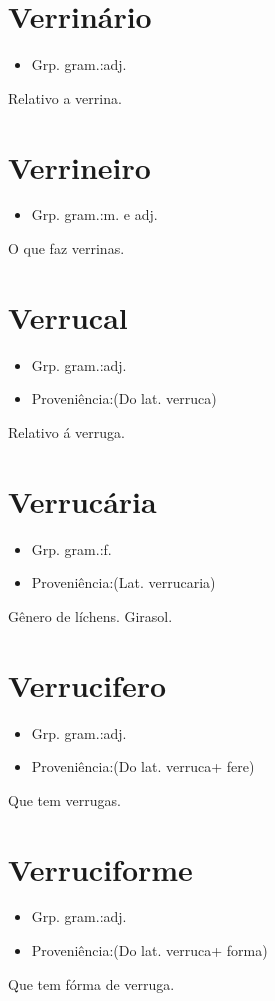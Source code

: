 \documentclass{article}
\begin{document}
\section{Verrinário}
\begin{itemize}
\item {Grp. gram.:adj.}
\end{itemize}
Relativo a verrina.
\section{Verrineiro}
\begin{itemize}
\item {Grp. gram.:m.  e  adj.}
\end{itemize}
O que faz verrinas.
\section{Verrucal}
\begin{itemize}
\item {Grp. gram.:adj.}
\end{itemize}
\begin{itemize}
\item {Proveniência:(Do lat. \textunderscore verruca\textunderscore )}
\end{itemize}
Relativo á verruga.
\section{Verrucária}
\begin{itemize}
\item {Grp. gram.:f.}
\end{itemize}
\begin{itemize}
\item {Proveniência:(Lat. \textunderscore verrucaria\textunderscore )}
\end{itemize}
Gênero de líchens.
Girasol.
\section{Verrucifero}
\begin{itemize}
\item {Grp. gram.:adj.}
\end{itemize}
\begin{itemize}
\item {Proveniência:(Do lat. \textunderscore verruca\textunderscore  + \textunderscore fere\textunderscore )}
\end{itemize}
Que tem verrugas.
\section{Verruciforme}
\begin{itemize}
\item {Grp. gram.:adj.}
\end{itemize}
\begin{itemize}
\item {Proveniência:(Do lat. \textunderscore verruca\textunderscore  + \textunderscore forma\textunderscore )}
\end{itemize}
Que tem fórma de verruga.
\end{document}
